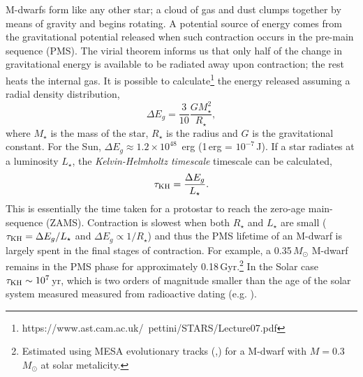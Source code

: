  M-dwarfs form like any other star; a cloud of gas and dust clumps together by means of gravity and begins rotating. A potential source of energy comes from the gravitational potential released when such contraction occurs in the pre-main sequence (PMS). The virial theorem informs us that only half of the change in gravitational energy is available to be radiated away upon contraction; the rest heats the internal gas. It is possible to calculate\footnote{https://www.ast.cam.ac.uk/~pettini/STARS/Lecture07.pdf} the energy released assuming a radial density distribution,
%
\begin{equation}\label{virial_energy}
    \Delta E_g = \frac{3}{10} \frac{G M_\star^2}{R_\star},
\end{equation}
%
where $M_\star$ is the mass of the star, $R_\star$ is the radius and $G$ is the gravitational constant. For the Sun, $\Delta E_g \approx 1.2 \times 10^{48}$\, erg (1\,erg = $10^{-7}$\,J). If a star radiates at a luminosity $L_\star$, the \textit{Kelvin-Helmholtz timescale} timescale can be calculated,
%
\begin{equation}\label{kelvin_helmholtz_timescale}
    \tau_{\rm KH} = \frac{\Delta E_g}{L_\star}.
\end{equation}
%
This is essentially the time taken for a protostar to reach the zero-age main-sequence (ZAMS). Contraction is slowest when both $R_\star$ and $L_\star$ are small ($\tau_{\rm KH} = \Delta E_g / L_\star$ and $\Delta E_g \propto 1/R_\star$) and thus the PMS lifetime of an M-dwarf is largely spent in the final stages of contraction. For example, a 0.35\,$M_\odot$ M-dwarf remains in the PMS phase for approximately 0.18\,Gyr.\footnote{Estimated using MESA evolutionary tracks (\citealt{2016ApJS..222....8D},\citealt{2016ApJ...823..102C}) for a M-dwarf with $M = 0.3$\,$M_\odot$ at solar metalicity.} In the Solar case $\tau_{\rm KH} \sim  10^{7}$\,yr, which is two orders of magnitude smaller than the age of the solar system measured measured from radioactive dating (e.g. \citealt{2005Natur.436.1127B}).



